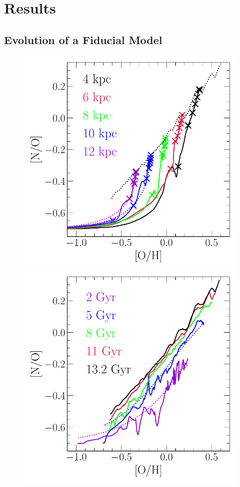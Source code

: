 \documentclass[ms.tex]{subfiles}
\begin{document}
\section{Results}
\label{sec:results}

\subsection{Evolution of a Fiducial Model}
\label{sec:results:fiducial}

\begin{figure}
\centering
\includegraphics[scale = 0.6]{no_oh_superposition.pdf}
\includegraphics[scale = 0.6]{no_oh_timeevol.pdf}

\end{figure}
\end{document}
